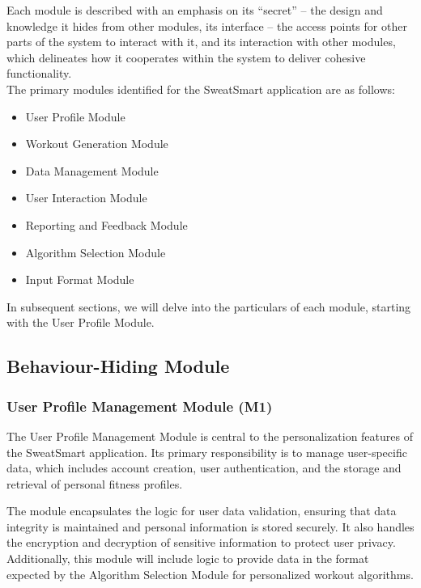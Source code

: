 \documentclass[12pt, titlepage]{article}
\begin{document}
Each module is described with an emphasis on its ``secret'' – the design and knowledge it hides from other modules, its interface – the access points for other parts of the system to interact with it, and its interaction with other modules, which delineates how it cooperates within the system to deliver cohesive functionality. \\

The primary modules identified for the SweatSmart application are as follows:

\begin{itemize}
    \item User Profile Module
    \item Workout Generation Module
    \item Data Management Module
    \item User Interaction Module
    \item Reporting and Feedback Module
    \item Algorithm Selection Module
    \item Input Format Module
\end{itemize}

In subsequent sections, we will delve into the particulars of each module, starting with the User Profile Module.

\subsection{Behaviour-Hiding Module}

\subsubsection{User Profile Management Module (M1)}

The User Profile Management Module is central to the personalization features of the SweatSmart application. Its primary responsibility is to manage user-specific data, which includes account creation, user authentication, and the storage and retrieval of personal fitness profiles.

\begin{description}[leftmargin=0pt]
\item[Secrets:] 
The module encapsulates the logic for user data validation, ensuring that data integrity is maintained and personal information is stored securely. It also handles the encryption and decryption of sensitive information to protect user privacy. Additionally, this module will include logic to provide data in the format expected by the Algorithm Selection Module for personalized workout algorithms.
\end{description}
\end{document}
